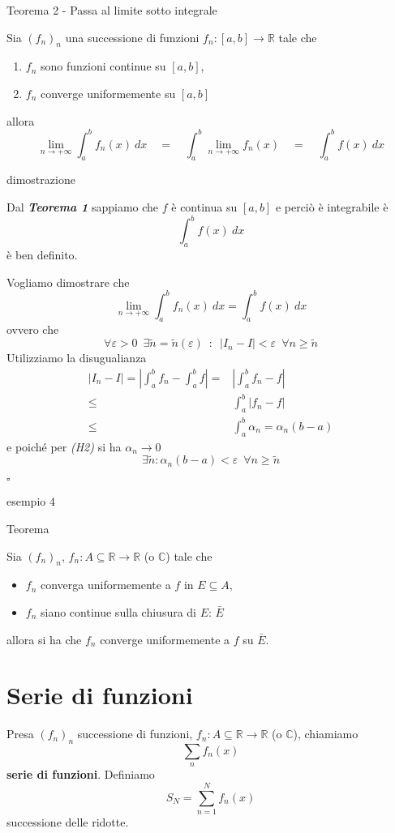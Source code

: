 \documentclass[x11names]{article}
\newcommand*{\QEDB}{\null\nobreak\hfill\ensuremath{\square}}%
\newcommand{\esempio}[2]{
	\begin{es}{esempio #1}
		#2
	\end{es}
}
\newcommand{\teorema}[2]{
	\begin{center}
		\fboxsep11pt
		\colorbox{myred}{\begin{minipage}{5.75in}
				\begin{redes}{#1}
					#2
				\end{redes}
		\end{minipage}}
	\end{center}
}
\newcommand{\dimostrazione}[2]{
	\begin{dym}{dimostrazione#1}
		#2
		\QEDB
	\end{dym}
}
\begin{document}
\teorema{Teorema 2 - Passa al limite sotto integrale}{
Sia \((f_{n})_{n}\) una successione di funzioni \(f_{n}:[a,b]\to \mathbb{R}\) tale che
\begin{enumerate}[start=1,label={(\itshape H\arabic*)}]
	\item \(f_{n}\) sono funzioni continue su \([a,b]\),
	\item \(f_{n}\) converge uniformemente su \([a,b]\)
\end{enumerate}
allora 
\[ 
\lim_{n\to+\infty} \int_{a}^{b}f_{n}(x) \: dx \quad = \quad \int_{a}^{b}\lim_{n\to+\infty} f_{n}(x) \quad = \quad \int_{a}^{b}f(x) \: dx
\]
}
\dimostrazione{}{
Dal \textit{\textbf{Teorema 1}} sappiamo che \(f\) è continua su \([a,b]\) e perciò è integrabile è 
\[ 
\int_{a}^{b}f(x)\: dx
\]
è ben definito.

Vogliamo dimostrare che
\[ 
\lim_{n\to+\infty}\int_{a}^{b}f_{n}(x)\: dx = \int_{a}^{b}f(x)\: dx 
\]
ovvero che 
\[ 
\forall \varepsilon > 0 \;\ \exists\tilde{n} = \tilde{n}(\varepsilon) \;\ : \;\ |I_{n} - I| < \varepsilon \;\ \forall n \geq \tilde{n}
\]
Utilizziamo la disugualianza
\begin{align*}
	|I_{n} - I|  = \left|\int_{a}^{b}f_{n} - \int_{a}^{b}f\right| =& \left|\int_{a}^{b}f_{n} - f\right| \\
    \leq & \int_{a}^{b}|f_{n} - f | \\
	\leq & \int_{a}^{b} \alpha_{n} = \alpha_{n}(b-a)
\end{align*}
e poiché per \textit{(H2)} si ha \(\alpha_{n} \to 0\) 
\[ 
\exists\tilde{n} : \alpha_{n}(b-a) < \varepsilon \;\ \forall n \geq \tilde{n}
\]
}

\esempio{4}{}

\teorema{Teorema}{
Sia \((f_{n})_{n}\), \(f_{n}:A\subseteq \mathbb{R}\to \mathbb{R}\) (o \(\mathbb{C}\)) tale che 
\begin{itemize}
	\item \(f_{n}\) converga uniformemente a \(f\) in \(E \subseteq A\),
	\item \(f_{n}\) siano continue sulla chiusura di \(E\): \(\bar{E}\)
\end{itemize}
allora si ha che \(f_{n}\) converge uniformemente a \(f\) su \(\bar{E}\).
}


\newpage
\section{Serie di funzioni}
Presa \((f_{n})_{n}\) successione di funzioni, \(f_{n}:A\subseteq \mathbb{R} \to \mathbb{R}\) (o \(\mathbb{C}\)), chiamiamo 
\[ 
\sum_n f_{n}(x)
\]
\textbf{serie di funzioni}. Definiamo
\[ 
S_{N} = \sum_{n=1}^N f_{n}(x)
\]
successione delle ridotte.
\end{document}
